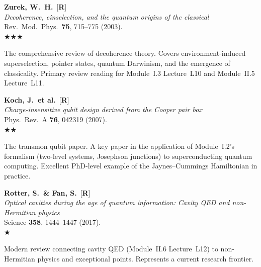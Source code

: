 \documentclass[11pt,a4paper]{article}
\newcommand{\essential}{$\bigstar\bigstar\bigstar$}
\newcommand{\recommended}{$\bigstar\bigstar$}
\newcommand{\useful}{$\bigstar$}
\newenvironment{bibentry}[1]{\begin{tcolorbox}[entrybox=#1,top=4pt,bottom=4pt]}{\end{tcolorbox}\smallskip}
\begin{document}
\begin{bibentry}{t5light}
\textbf{Zurek, W.~H.}\ [\textbf{R}]\\
\textit{Decoherence, einselection, and the quantum origins of the classical}\\
Rev.~Mod.~Phys.~\textbf{75}, 715--775 (2003).\\[3pt]
\essential\\[3pt]
\begin{tcolorbox}[annotbox]
The comprehensive review of decoherence theory. Covers environment-induced
superselection, pointer states, quantum Darwinism, and the emergence of classicality.
Primary review reading for Module~I.3 Lecture~L10 and Module~II.5 Lecture~L11.
\end{tcolorbox}
\end{bibentry}

\begin{bibentry}{t5light}
\textbf{Koch, J.\ et al.}\ [\textbf{R}]\\
\textit{Charge-insensitive qubit design derived from the Cooper pair box}\\
Phys.~Rev.~A \textbf{76}, 042319 (2007).\\[3pt]
\recommended\\[3pt]
\begin{tcolorbox}[annotbox]
The transmon qubit paper. A key paper in the application of Module~I.2's formalism
(two-level systems, Josephson junctions) to superconducting quantum computing.
Excellent PhD-level example of the Jaynes--Cummings Hamiltonian in practice.
\end{tcolorbox}
\end{bibentry}

\begin{bibentry}{t5light}
\textbf{Rotter, S.\ \& Fan, S.}\ [\textbf{R}]\\
\textit{Optical cavities during the age of quantum information: Cavity QED and non-Hermitian physics}\\
Science \textbf{358}, 1444--1447 (2017).\\[3pt]
\useful\\[3pt]
\begin{tcolorbox}[annotbox]
Modern review connecting cavity QED (Module~II.6 Lecture~L12) to non-Hermitian
physics and exceptional points. Represents a current research frontier.
\end{tcolorbox}
\end{bibentry}

\newpage
\end{document}
